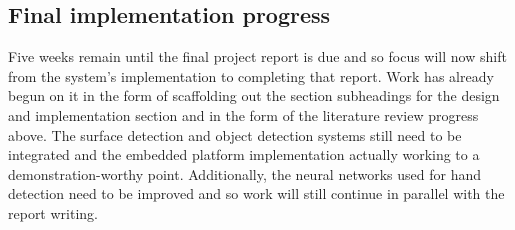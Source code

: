 \subsection{Final implementation progress}

Five weeks remain until the final project report is due and so focus will now shift from the system's implementation to completing that report. Work has already begun on it in the form of scaffolding out the section subheadings for the design and implementation section and in the form of the literature review progress above. The surface detection and object detection systems still need to be integrated and the embedded platform implementation actually working to a demonstration-worthy point. Additionally, the neural networks used for hand detection need to be improved and so work will still continue in parallel with the report writing.